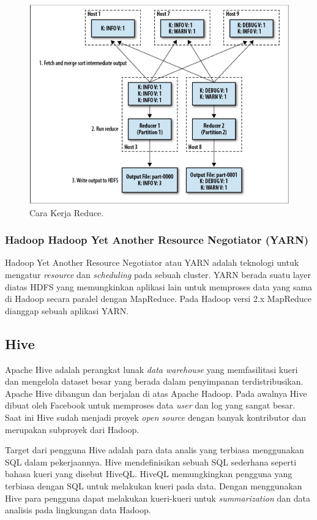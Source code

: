 \begin{figure}
	\centering
	\includegraphics[scale=0.5]{Gambar/how-reducer-works.png}
	\caption[Cara  Kerja Reduce]{Cara Kerja Reduce.\cite{sammer2012hadoop}}
	\label{fig:reducer_works}
\end{figure}
	
\subsubsection{Hadoop Hadoop Yet Another Resource Negotiator (YARN)}
Hadoop Yet Another Resource Negotiator atau YARN adalah teknologi untuk mengatur \textit{resource} dan \textit{scheduling} pada sebuah cluster. YARN berada suatu layer diatas HDFS yang memungkinkan aplikasi lain untuk memproses data yang sama di Hadoop secara paralel dengan MapReduce. Pada Hadoop versi 2.x MapReduce dianggap sebuah aplikasi YARN.

\subsection{Hive}
\label{sec:hive}
Apache Hive adalah perangkat lunak \textit{data warehouse} yang memfasilitasi kueri dan mengelola dataset besar yang berada dalam penyimpanan terdistribusikan. Apache Hive dibangun dan berjalan di atas Apache Hadoop. Pada awalnya Hive dibuat oleh Facebook untuk memproses data \textit{user} dan log yang sangat besar. Saat ini Hive sudah menjadi proyek \textit{open source} dengan banyak kontributor dan merupakan subproyek dari Hadoop.  

Target dari pengguna Hive adalah para data analis yang terbiasa menggunakan SQL dalam pekerjaannya. Hive mendefinisikan sebuah SQL sederhana seperti bahasa kueri yang disebut HiveQL. HiveQL memungkingkan pengguna yang terbiasa dengan SQL untuk melakukan kueri pada data. Dengan menggunakan Hive para pengguna dapat melakukan kueri-kueri untuk \textit{summarization} dan data analisis pada lingkungan data Hadoop. 

